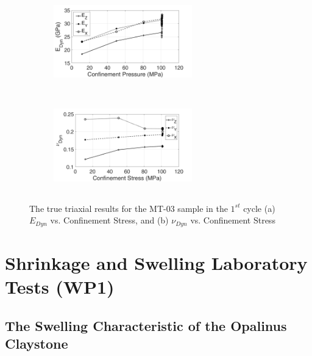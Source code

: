 \begin{figure}[ht!]
\centering
\begin{subfigure}[c]{0.48\textwidth}
\centering
\includegraphics[width=6cm,height=4cm]{figures/Amir_TrueTriaxial_MT_03_Result_E.png}
\subcaption{}
\end{subfigure}
\hfill
\begin{subfigure}[c]{0.48\textwidth}
\centering
\includegraphics[width=6cm,height=4cm]{figures/Amir_TrueTriaxial_MT_03_Result_Nu.png}
\subcaption{}
\end{subfigure}
\caption{The true triaxial results for the MT-03 sample in the $1^{st}$ cycle (a) $E_{Dyn}$ vs. Confinement Stress, and (b) $\nu_{Dyn}$ vs. Confinement Stress}
\label{fig:Amir_TrueTriaxial_MT_03_Result}
\end{figure}


\section{Shrinkage and Swelling Laboratory Tests (WP1)}

\subsection{The Swelling Characteristic of the Opalinus Claystone}


